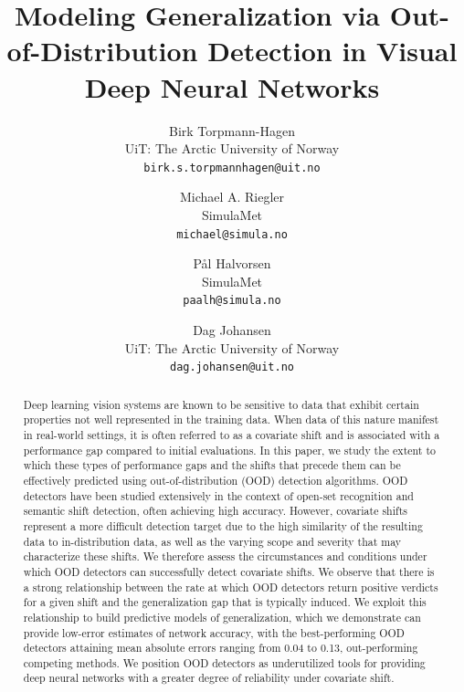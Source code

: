 \documentclass[10pt,twocolumn,letterpaper]{article}
\begin{document}
\title{Modeling Generalization via Out-of-Distribution Detection in Visual Deep Neural Networks}

\author{Birk Torpmann-Hagen\\
UiT: The Arctic University of Norway\\
{\tt\small birk.s.torpmannhagen@uit.no}
\and
Michael A. Riegler\\
SimulaMet\\
{\tt\small michael@simula.no}
\and
Pål Halvorsen\\
SimulaMet\\
{\tt\small paalh@simula.no}
\and
Dag Johansen\\
UiT: The Arctic University of Norway\\
{\tt\small dag.johansen@uit.no}
}




\maketitle
\begin{abstract}
    Deep learning vision systems are known to be sensitive to data that exhibit certain properties not well represented in the training data. When data of this nature manifest in real-world settings, it is often referred to as a covariate shift and is associated with a performance gap compared to initial evaluations. In this paper, we study the extent to which these types of performance gaps and the shifts that precede them can be effectively predicted using out-of-distribution (OOD) detection algorithms. OOD detectors have been studied extensively in the context of open-set recognition and semantic shift detection, often achieving high accuracy. However, covariate shifts represent a more difficult detection target due to the high similarity of the resulting data to in-distribution data, as well as the varying scope and severity that may characterize these shifts. We therefore assess the circumstances and conditions under which OOD detectors can successfully detect covariate shifts. We observe that there is a strong relationship between the rate at which OOD detectors return positive verdicts for a given shift and the generalization gap that is typically induced. We exploit this relationship to build predictive models of generalization, which we demonstrate can provide low-error estimates of network accuracy, with the best-performing OOD detectors attaining mean absolute errors ranging from 0.04 to 0.13, out-performing competing methods. We position OOD detectors as underutilized tools for providing deep neural networks with a greater degree of reliability under covariate shift.  
\end{abstract}
\end{document}
